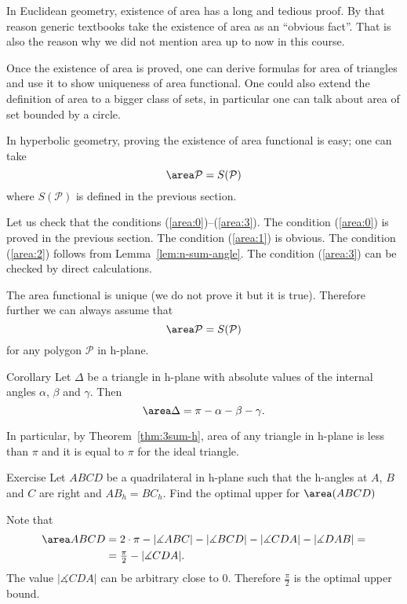 In Euclidean geometry, existence of area has a  long and tedious proof.
By that reason generic textbooks 
take the existence of area as an ``obvious fact''.
That is also the reason why we did not mention area up to now in this course.

Once the existence of area is proved, 
one can derive formulas for area of triangles and use it to show uniqueness of area functional.
One could also extend the definition of area to a bigger class of sets,
in particular one can talk about area of set bounded by a circle.

In hyperbolic geometry,
proving the existence of area functional is easy;
one can take 
$$\area\mathcal{P}= S(\mathcal{P})$$
where $S(\mathcal{P})$ is defined in the previous section.

Let us check that the conditions (\ref{area:0})--(\ref{area:3}).
The condition (\ref{area:0}) is proved in the previous section.
The condition (\ref{area:1}) is obvious.
The condition (\ref{area:2}) follows from Lemma~\ref{lem:n-sum-angle}.
The condition (\ref{area:3}) can be checked by direct calculations.
\qeds


The area functional is unique (we do not prove it but it is true).
Therefore further we can always assume that
$$\area\mathcal{P}= S(\mathcal{P})$$
for any polygon $\mathcal{P}$ in h-plane.


\begin{thm}{Corollary}\label{cor:area-h-trig}
Let $\Delta$ be a triangle in h-plane with absolute values of the internal angles $\alpha$, $\beta$ and $\gamma$.
Then 
$$\area\Delta=\pi-\alpha-\beta-\gamma.$$

In particular, by Theorem~\ref{thm:3sum-h},
area of any triangle in h-plane is less than $\pi$ and it is equal to $\pi$ for the ideal triangle.
\end{thm}

\begin{thm}{Exercise}\label{ex:area-sup}
Let $ABCD$ be a quadrilateral in h-plane such that the h-angles at $A$, $B$ and $C$ are right and $AB_h=BC_h$.
 Find the optimal upper for $\area(ABCD)$
\end{thm}

















Note that 
\begin{align*}
\area ABCD
&=
2\cdot\pi-|\measuredangle ABC|-|\measuredangle BCD|-|\measuredangle CDA|-|\measuredangle DAB|=
\\
&=\tfrac{\pi}2-|\measuredangle CDA|.
\end{align*}
The value $|\measuredangle CDA|$ can be arbitrary close to $0$.
Therefore $\tfrac{\pi}2$ is the optimal upper bound.









